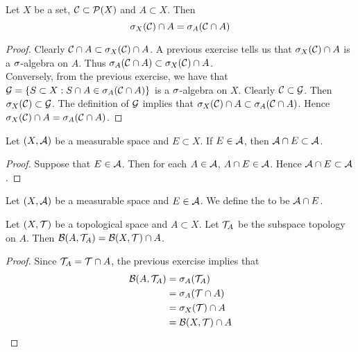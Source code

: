 \documentclass{book}
\begin{document}
	\begin{ex}  
		Let $X$ be a set, $\mathcal{C} \subset \mathcal{P}(X)$ and $A \subset X$. Then $$\sigma_X(\mathcal{C}) \cap A = \sigma_A(\mathcal{C} \cap A)$$
	\end{ex}
	
	\begin{proof}
		Clearly $\mathcal{C} \cap A \subset \sigma_X(\mathcal{C}) \cap A$. A previous exercise tells us that $\sigma_X(\mathcal{C}) \cap A$ is a $\sigma$-algebra on $A$. Thus $\sigma_A(\mathcal{C} \cap A) \subset \sigma_X(\mathcal{C}) \cap A$. \vspace{3mm} \\ 
		Conversely, from the previous exercise, we have that $\mathcal{G} = \{S \subset X: S \cap A \in \sigma_A(\mathcal{C} \cap A)\}$ is a $\sigma$-algebra on $X$. Clearly $\mathcal{C} \subset \mathcal{G}$. Then $\sigma_X(\mathcal{C}) \subset \mathcal{G}$. The definition of $\mathcal{G}$ implies that $\sigma_X(\mathcal{C}) \cap A \subset \sigma_A(\mathcal{C} \cap A)$. Hence $\sigma_X(\mathcal{C}) \cap A = \sigma_A(\mathcal{C} \cap A)$.
	\end{proof}

	\begin{ex}
		Let $(X, \mathcal{A})$ be a measurable space and $E \subset X$. If $E \in \mathcal{A}$, then $\mathcal{A} \cap E \subset \mathcal{A}$.
	\end{ex}

	\begin{proof}
		Suppose that $E \in \mathcal{A}$. Then for each $A \in \mathcal{A}$, $A \cap E \in \mathcal{A}$. Hence $\mathcal{A} \cap E \subset \mathcal{A}$.
	\end{proof}

	\begin{defn}
		Let $(X, \mathcal{A})$ be a measurable space and $E \in \mathcal{A}$. We define the  to be $\mathcal{A} \cap E$.
	\end{defn}

	\begin{ex} 
		Let $(X, \mathcal{T})$ be a topological space and $A \subset X$. Let $\mathcal{T}_A$ be the subspace topology on $A$. Then $\mathcal{B}(A, \mathcal{T}_A) = \mathcal{B}(X, \mathcal{T}) \cap A$.
	\end{ex}

	\begin{proof}
		Since $\mathcal{T}_A = \mathcal{T} \cap A$, the previous exercise implies that 
		\begin{align*}
			\mathcal{B}(A, \mathcal{T}_A) 
			& = \sigma_A(\mathcal{T}_A) \\
			& = \sigma_A(\mathcal{T} \cap A) \\
			& = \sigma_X(\mathcal{T}) \cap A \\
			& = \mathcal{B}(X, \mathcal{T}) \cap A
		\end{align*}
	\end{proof}
\end{document}
